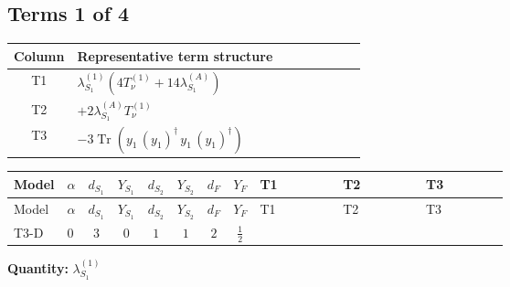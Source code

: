 \documentclass[8pt]{article}
\begin{document}
\begin{landscape}
\subsection*{Terms 1 of 4}
\begin{center}
\begin{tabular}{@{}c >{\raggedright\arraybackslash}p{0.82\linewidth}@{}}
\toprule
Column & Representative term structure \\
\midrule
T1 & \(\displaystyle {\lambda_{S_1}^{(1)}} (4 T_{\nu}^{(1)}+14 {\lambda_{S_1}^{(A)}})\) \\
\midrule
T2 & \(\displaystyle +2 {\lambda_{S_1}^{(A)}} T_{\nu}^{(1)}\) \\
\midrule
T3 & \(\displaystyle -3 \operatorname{Tr}\!\left({y_1}\,\left({y_1}\right)^{\dagger}\,{y_1}\,\left({y_1}\right)^{\dagger}\right)\) \\
\midrule
\bottomrule
\end{tabular}
\end{center}
\smallskip
\tiny
\begin{longtable}{@{}llcccccc >{\raggedright\arraybackslash}p{0.21\linewidth} >{\raggedright\arraybackslash}p{0.21\linewidth} >{\raggedright\arraybackslash}p{0.21\linewidth}@{}}
\toprule
Model & $\alpha$ & $d_{S_1}$ & $Y_{S_1}$ & $d_{S_2}$ & $Y_{S_2}$ & $d_F$ & $Y_F$ & T1 & T2 & T3 \\
\midrule
\endfirsthead
\toprule
Model & $\alpha$ & $d_{S_1}$ & $Y_{S_1}$ & $d_{S_2}$ & $Y_{S_2}$ & $d_F$ & $Y_F$ & T1 & T2 & T3 \\
\midrule
\endhead
T3-D & $0$ & $3$ & $0$ & $1$ & $1$ & $2$ & $\frac{1}{2}$ & \scriptsize\adjustbox{max width=\linewidth}{$\begin{gathered} {\lambda_{S_1}^{(1)}} (4 T_{\nu}^{(1)}+14 {\lambda_{S_1}^{(A)}})\end{gathered}$} & \scriptsize\adjustbox{max width=\linewidth}{$\begin{gathered} +2 {\lambda_{S_1}^{(A)}} T_{\nu}^{(1)}\end{gathered}$} & \scriptsize\adjustbox{max width=\linewidth}{$\begin{gathered} -3 \operatorname{Tr}\!\left({y_1}\,\left({y_1}\right)^{\dagger}\,{y_1}\,\left({y_1}\right)^{\dagger}\right)\end{gathered}$} \\
\midrule
\bottomrule
\end{longtable}
\clearpage
\noindent\textbf{Quantity: }$\lambda_{S_1}^{(1)}$\par\smallskip

\end{landscape}
\end{document}
